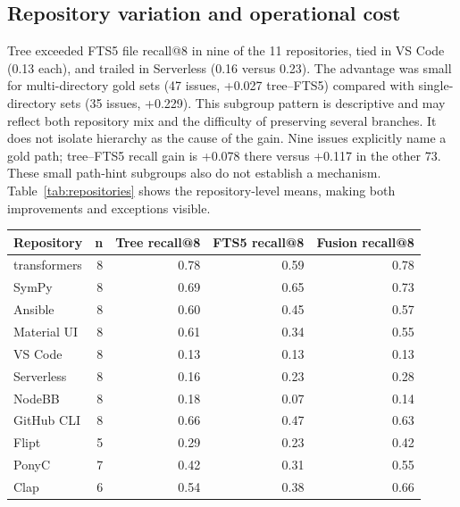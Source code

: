 \documentclass[
]{article}
\newcounter{none} %
\begin{document}
\subsection{Repository variation and operational
cost}\label{repository-variation-and-operational-cost}

Tree exceeded FTS5 file recall@8 in nine of the 11 repositories, tied in
VS Code (0.13 each), and trailed in Serverless (0.16 versus 0.23). The
advantage was small for multi-directory gold sets (47 issues, +0.027
tree--FTS5) compared with single-directory sets (35 issues, +0.229).
This subgroup pattern is descriptive and may reflect both repository mix
and the difficulty of preserving several branches. It does not isolate
hierarchy as the cause of the gain. Nine issues explicitly name a gold
path; tree--FTS5 recall gain is +0.078 there versus +0.117 in the other
73. These small path-hint subgroups also do not establish a mechanism.
Table~\ref{tab:repositories} shows the repository-level
means, making both improvements and exceptions visible.

\label{tab:repositories}
{\def\LTcaptype{none} %
\begin{longtable}[]{@{}lrrrr@{}}
\toprule\noalign{}
Repository & n & Tree recall@8 & FTS5 recall@8 & Fusion recall@8 \\
\midrule\noalign{}
\endhead
\bottomrule\noalign{}
\endlastfoot
transformers & 8 & 0.78 & 0.59 & 0.78 \\
SymPy & 8 & 0.69 & 0.65 & 0.73 \\
Ansible & 8 & 0.60 & 0.45 & 0.57 \\
Material UI & 8 & 0.61 & 0.34 & 0.55 \\
VS Code & 8 & 0.13 & 0.13 & 0.13 \\
Serverless & 8 & 0.16 & 0.23 & 0.28 \\
NodeBB & 8 & 0.18 & 0.07 & 0.14 \\
GitHub CLI & 8 & 0.66 & 0.47 & 0.63 \\
Flipt & 5 & 0.29 & 0.23 & 0.42 \\
PonyC & 7 & 0.42 & 0.31 & 0.55 \\
Clap & 6 & 0.54 & 0.38 & 0.66 \\
\end{longtable}
}
\end{document}
